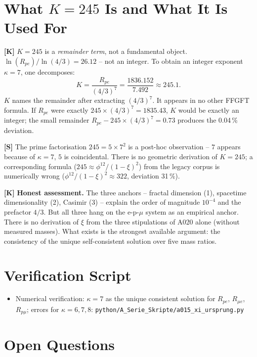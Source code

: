 \section{What $K = 245$ Is and What It Is Used For}

\textbf{[K]} $K=245$ is a \emph{remainder term}, not a fundamental object.
$\ln(R_{pe})/\ln(4/3) = 26{.}12$ -- not an integer. To obtain an integer
exponent $\kappa=7$, one decomposes:
\[
  K = \frac{R_{pe}}{(4/3)^7}
  = \frac{1836{.}152}{7{.}492} \approx 245{.}1.
\]
$K$ names the remainder after extracting $(4/3)^7$. It appears in no other
FFGFT formula. If $R_{pe}$ were exactly $245\times(4/3)^7=1835{.}43$,
$K$ would be exactly an integer; the small remainder $R_{pe}-245\times(4/3)^7=0{.}73$
produces the 0{.}04\,\% deviation.

\textbf{[S]} The prime factorisation $245=5\times7^2$ is a post-hoc
observation -- $7$ appears because of $\kappa=7$, $5$ is coincidental.
There is no geometric derivation of $K=245$; a corresponding formula
($245\approx\phi^{12}/(1-\xi)^2$) from the legacy corpus is numerically
wrong ($\phi^{12}/(1-\xi)^2\approx322$, deviation 31\,\%).

\textbf{[K]} \textbf{Honest assessment.} The three anchors --
fractal dimension (1), spacetime dimensionality (2), Casimir (3) --
explain the order of magnitude $10^{-4}$ and the prefactor $4/3$. But all
three hang on the e-p-$\mu$ system as an empirical anchor. There is no
derivation of $\xi$ from the three stipulations of A020 alone (without
measured masses). What exists is the strongest available argument: the
consistency of the unique self-consistent solution over five mass ratios.

\section{Verification Script}

\begin{itemize}[leftmargin=2em,itemsep=2pt,topsep=2pt]
  \item Numerical verification: $\kappa=7$ as the unique consistent solution
    for $R_{pe}$, $R_{\mu e}$, $R_{p\mu}$; errors for $\kappa=6,7,8$:
    \texttt{python/A\_Serie\_Skripte/a015\_xi\_ursprung.py}
\end{itemize}

\section{Open Questions}


